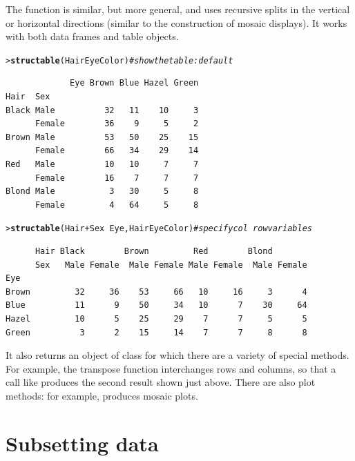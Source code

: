 \documentclass[10pt,krantz2]{krantz}\usepackage[]{graphicx}\usepackage[]{color}
\makeatletter
\newcommand{\hlcom}[1]{\textcolor[rgb]{0.678,0.584,0.686}{\textit{#1}}}%
\newcommand{\hlopt}[1]{\textcolor[rgb]{0,0,0}{#1}}%
\newcommand{\hlstd}[1]{\textcolor[rgb]{0.345,0.345,0.345}{#1}}%
\newcommand{\hlkwd}[1]{\textcolor[rgb]{0.737,0.353,0.396}{\textbf{#1}}}%
\newenvironment{kframe}{%
 \def\at@end@of@kframe{}%
 \ifinner\ifhmode%
  \def\at@end@of@kframe{\end{minipage}}%
  \begin{minipage}{\columnwidth}%
 \fi\fi%
 \def\FrameCommand##1{\hskip\@totalleftmargin \hskip-\fboxsep
 \colorbox{shadecolor}{##1}\hskip-\fboxsep
     \hskip-\linewidth \hskip-\@totalleftmargin \hskip\columnwidth}%
 \MakeFramed {\advance\hsize-\width
   \@totalleftmargin\z@ \linewidth\hsize
   \@setminipage}}%
 {\par\unskip\endMakeFramed%
 \at@end@of@kframe}
\newenvironment{knitrout}{}{} %
\renewenvironment{knitrout}{\small\renewcommand{\baselinestretch}{.85}}{} %
\makeatother
\begin{document}
The  function is similar, but more general, and uses
recursive splits in the vertical or horizontal directions
(similar to the construction of mosaic displays).  It works with both
data frames and table objects.
\begin{knitrout}
\color{fgcolor}\begin{kframe}
\begin{alltt}
\hlstd{> }\hlkwd{structable}\hlstd{(HairEyeColor)}                   \hlcom{# show the table: default}
\end{alltt}
\begin{verbatim}
             Eye Brown Blue Hazel Green
Hair  Sex                              
Black Male          32   11    10     3
      Female        36    9     5     2
Brown Male          53   50    25    15
      Female        66   34    29    14
Red   Male          10   10     7     7
      Female        16    7     7     7
Blond Male           3   30     5     8
      Female         4   64     5     8
\end{verbatim}
\begin{alltt}
\hlstd{> }\hlkwd{structable}\hlstd{(Hair} \hlopt{+} \hlstd{Sex} \hlopt{~} \hlstd{Eye, HairEyeColor)}   \hlcom{# specify col ~ row variables}
\end{alltt}
\begin{verbatim}
      Hair Black        Brown         Red        Blond       
      Sex   Male Female  Male Female Male Female  Male Female
Eye                                                          
Brown         32     36    53     66   10     16     3      4
Blue          11      9    50     34   10      7    30     64
Hazel         10      5    25     29    7      7     5      5
Green          3      2    15     14    7      7     8      8
\end{verbatim}
\end{kframe}
\end{knitrout}
It also returns an object of class  for which there are a
variety of special methods.  For example, the transpose function 
interchanges rows and columns, so that a call like 
produces the second result shown just above.
There are also plot methods: for example,  produces mosaic plots.

\section[Subsetting data]{Subsetting data}\label{sec:subsettingdata}
\end{document}
